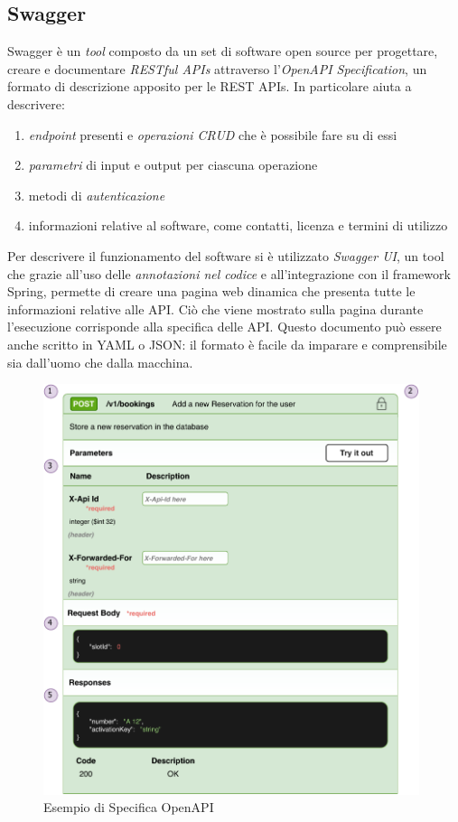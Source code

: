 \subsection{Swagger}
Swagger è un \emph{tool} composto da un set di software open source per progettare, creare e documentare \emph{RESTful APIs} attraverso l’\emph{OpenAPI Specification}, un formato di descrizione apposito per le REST APIs. In particolare aiuta a descrivere:
\begin{enumerate}
    \item \emph{endpoint} presenti e \emph{operazioni CRUD} che è possibile fare su di essi
    \item \emph{parametri} di input e output per ciascuna operazione
    \item metodi di \emph{autenticazione}
    \item informazioni relative al software, come contatti, licenza e termini di utilizzo
\end{enumerate}
Per descrivere il funzionamento del software si è utilizzato \emph{Swagger UI}, un tool che grazie all'uso delle \emph{annotazioni nel codice} e all'integrazione con il framework Spring, permette di creare una pagina web dinamica che presenta tutte le informazioni relative alle API. Ciò che viene mostrato sulla pagina durante l'esecuzione corrisponde alla specifica delle API. Questo documento può essere anche scritto in YAML o JSON: il formato è facile da imparare e comprensibile sia dall'uomo che dalla macchina. 

\begin{figure}[H]
    \centering
    \includegraphics[width=0.98\textwidth]{images/03_2_swaggerui.pdf}
    \caption{Esempio di Specifica OpenAPI}
    \label{fig:swaggerexample}
\end{figure}

